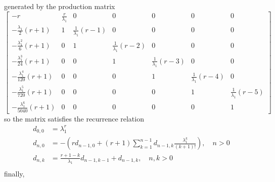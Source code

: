 generated by the production matrix
\begin{displaymath}
\left[\begin{matrix}- r & \frac{r}{\lambda_{1}} & 0 & 0 & 0 & 0 & 0\\- \frac{\lambda_{1}}{2} \left(r + 1\right) & 1 & \frac{1}{\lambda_{1}} \left(r - 1\right) & 0 & 0 & 0 & 0\\- \frac{\lambda_{1}^{2}}{6} \left(r + 1\right) & 0 & 1 & \frac{1}{\lambda_{1}} \left(r - 2\right) & 0 & 0 & 0\\- \frac{\lambda_{1}^{3}}{24} \left(r + 1\right) & 0 & 0 & 1 & \frac{1}{\lambda_{1}} \left(r - 3\right) & 0 & 0\\- \frac{\lambda_{1}^{4}}{120} \left(r + 1\right) & 0 & 0 & 0 & 1 & \frac{1}{\lambda_{1}} \left(r - 4\right) & 0\\- \frac{\lambda_{1}^{5}}{720} \left(r + 1\right) & 0 & 0 & 0 & 0 & 1 & \frac{1}{\lambda_{1}} \left(r - 5\right)\\- \frac{\lambda_{1}^{6}}{5040} \left(r + 1\right) & 0 & 0 & 0 & 0 & 0 & 1\end{matrix}\right]
\end{displaymath}
so the matrix satisfies the recurrence relation 
\begin{displaymath}
\begin{split}
d_{0,0}&=\lambda_{1}^{r}\\
d_{n,0}&=-\left(r d_{n-1, 0} + (r+1)\sum_{k=1}^{n-1}{d_{n-1, k}\frac{\lambda_{1}^{k}}{(k+1)!}}\right), \quad n>0 \\
d_{n,k}&=\frac{r+1-k}{\lambda_{1}}d_{n-1, k-1} + d_{n-1,k}, \quad n,k > 0\\
\end{split}
\end{displaymath}
finally,
